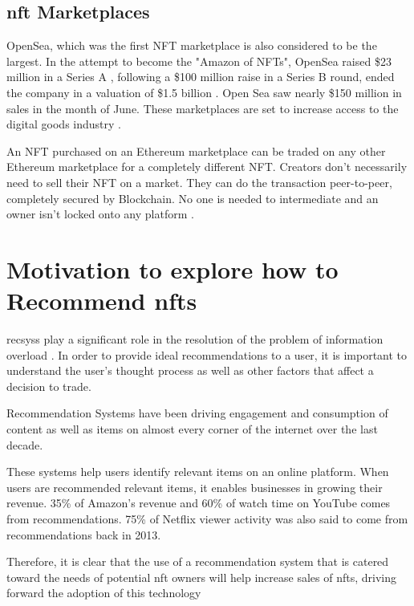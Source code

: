 \documentclass[conference]{IEEEtran}
\begin{document}
\subsection{\gls{nft} Marketplaces}
OpenSea, which was the first NFT marketplace is also considered to be the largest. In the attempt to become the "Amazon of NFTs", OpenSea raised \$23 million in a Series A \autocite{hackett_this_2021}, following a \$100 million raise in a Series B round, ended the company in a valuation of \$1.5 billion \autocite{dfinzer_announcing_2021, matney_nft_2021}. Open Sea saw nearly \$150 million in sales in the month of June.
These marketplaces are set to increase access to the digital goods industry \autocite{chevet_blockchain_2018}.


An NFT purchased on an Ethereum marketplace can be traded on any other Ethereum marketplace for a completely different NFT. Creators don't necessarily need to sell their NFT on a market. They can do the transaction peer-to-peer, completely secured by Blockchain. No one is needed to intermediate and an owner isn't locked onto any platform \autocite{noauthor_erc-721_nodate}.


\section{Motivation to explore how to Recommend \gls{nft}s}

\gls{recsys}s play a significant role in the resolution of the problem of information overload \autocite{cheng_hybrid_2020}. In order to provide ideal recommendations to a user, it is important to understand the user's thought process as well as other factors that affect a decision to trade.

Recommendation Systems have been driving engagement and consumption of content as well as items on almost every corner of the internet over the last decade.

These systems help users identify relevant items on an online platform. When users are recommended relevant items, it enables businesses in growing their revenue. 35\% of Amazon’s revenue \autocite{naumov_deep_2019} and 60\% of watch time on YouTube \autocite{noauthor_recommendations_nodate} comes from recommendations. 75\% of Netflix viewer activity \cite{vanderbilt_science_nodate} was also said to come from recommendations back in 2013.

Therefore, it is clear that the use of a recommendation system that is catered toward the needs of potential \gls{nft} owners will help increase sales of \gls{nft}s, driving forward the adoption of this technology
\end{document}
